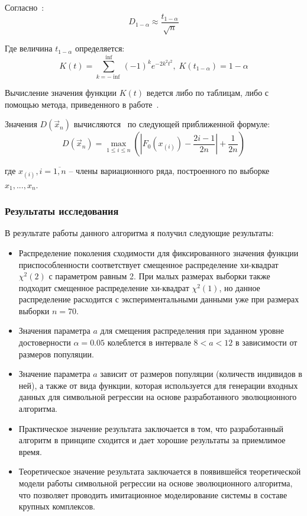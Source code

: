 Согласно~\cite{BlueStatistics}:
\begin{equation}
D_{1 - \alpha} \approx \frac{t_{1 - \alpha}}{\sqrt{n}}
\end{equation}

Где величина $t_{1 - \alpha}$ определяется:
\begin{equation}
K(t) = \sum_{k = - \inf}^{\inf} (-1)^k e^{-2 k^2 t^2}, \; K(t_{1-\alpha}) =  1 - \alpha
\end{equation}

Вычисление значения функции $K(t)$ ведется либо по таблицам, либо с помощью метода, приведенного в работе~\cite{KolmogorovSmirnov}.

Значения $D(\vec{x}_n)$ вычисляются~\cite{BlueStatistics} по следующей приближенной формуле:
\begin{equation}
D(\vec{x}_n) = \max_{1 \leq i \leq n} \left ( \left | F_0(x_{(i)}) - \frac{2i - 1}{2n} \right | + \frac{1}{2n}  \right )
\end{equation}
\begin{ESKDExplanation}
\item[где ] $x_{(i)}, i = \overline{1,n}$ -- члены вариационного ряда, построенного по выборке $x_1, ..., x_n$.
\end{ESKDExplanation}

\subsubsection{Результаты исследования}
В результате работы данного алгоритма я получил следующие результаты:
\begin{itemize}
\item Распределение поколения сходимости для фиксированного значения функции приспособленности соответствует смещенное распределение хи-квадрат $\chi^2(2)$ с параметром равным 2. При малых размерах выборки также подходит смещенное распределение хи-квадрат $\chi^2(1)$, но данное распределение расходится с экспериментальными данными уже при размерах выборки $n = 70$.
\item Значения параметра $a$ для смещения распределения при заданном уровне достоверности $\alpha = 0.05$ колеблется в интервале $8 < a < 12$ в зависимости от размеров популяции.
\item Значение параметра $a$ зависит от размеров популяции (количеств индивидов в ней), а также от вида функции, которая используется для генерации входных данных для символьной регрессии на основе разработанного эволюционного алгоритма.
\item Практическое значение результата заключается в том, что разработанный алгоритм в принципе сходится и дает хорошие результаты за приемлимое время.
\item Теоретическое значение результата заключается в появившейся теоретической модели работы символьной регрессии на основе эволюционного алгоритма, что позволяет проводить имитационное моделирование системы в составе крупных комплексов.
\end{itemize}

